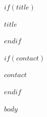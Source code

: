 \documentclass[11pt]{article}
\newcommand{\resumename}[1]{\begin{center}\textbf{\Large #1}\end{center}}
\newcommand{\resumecontact}[1]{\begin{center}#1\end{center}}
\begin{document}
$if(title)$
\resumename{$title$}
$endif$

$if(contact)$
\resumecontact{$contact$}
$endif$

$body$
\end{document}
